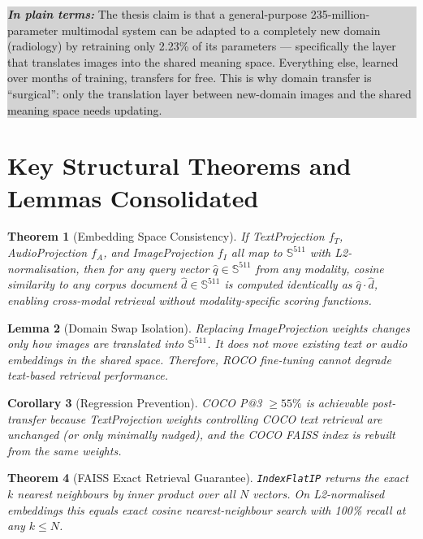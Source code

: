 \documentclass[12pt, a4paper]{article}
\theoremstyle{definition}
\theoremstyle{plain}
\newtheorem{theorem}{Theorem}[section]
\newtheorem{lemma}[theorem]{Lemma}
\newtheorem{corollary}[theorem]{Corollary}
\theoremstyle{remark}
\newcommand{\Sphere}{\mathbb{S}}
\newcommand{\layman}[1]{%
  \vspace{4pt}%
  \noindent\colorbox{lightgray}{\parbox{\dimexpr\linewidth-2\fboxsep}{%
    \textbf{\textit{In plain terms:}} #1}}%
  \vspace{4pt}%
}
\begin{document}
\layman{The thesis claim is that a general-purpose 235-million-parameter multimodal system can be adapted to a completely new domain (radiology) by retraining only 2.23\% of its parameters --- specifically the layer that translates images into the shared meaning space. Everything else, learned over months of training, transfers for free. This is why domain transfer is ``surgical'': only the translation layer between new-domain images and the shared meaning space needs updating.}

\section{Key Structural Theorems and Lemmas Consolidated}
\label{sec:consolidated}

\begin{theorem}[Embedding Space Consistency]
If TextProjection $f_T$, AudioProjection $f_A$, and ImageProjection $f_I$ all map to $\Sphere^{511}$ with L2-normalisation, then for any query vector $\hat{q} \in \Sphere^{511}$ from any modality, cosine similarity to any corpus document $\hat{d} \in \Sphere^{511}$ is computed identically as $\hat{q} \cdot \hat{d}$, enabling cross-modal retrieval without modality-specific scoring functions.
\end{theorem}

\begin{lemma}[Domain Swap Isolation]
Replacing ImageProjection weights changes only how images are \emph{translated} into $\Sphere^{511}$. It does not move existing text or audio embeddings in the shared space. Therefore, ROCO fine-tuning cannot degrade text-based retrieval performance.
\end{lemma}

\begin{corollary}[Regression Prevention]
COCO P@3 $\geq 55\%$ is achievable post-transfer because TextProjection weights controlling COCO text retrieval are unchanged (or only minimally nudged), and the COCO FAISS index is rebuilt from the same weights.
\end{corollary}

\begin{theorem}[FAISS Exact Retrieval Guarantee]
\texttt{IndexFlatIP} returns the exact $k$ nearest neighbours by inner product over all $N$ vectors. On L2-normalised embeddings this equals exact cosine nearest-neighbour search with 100\% recall at any $k \leq N$.
\end{theorem}
\end{document}
